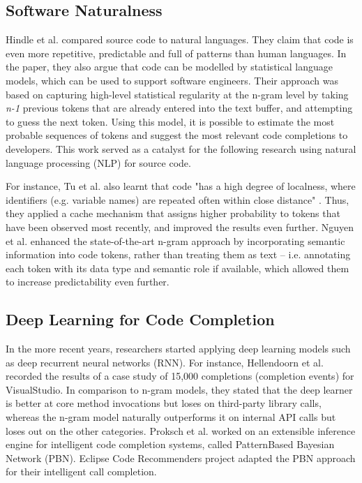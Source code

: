 \documentclass[sigplan,screen]{acmart}
\begin{document}
\subsection{Software Naturalness}
Hindle et al. \cite{Hind12a} compared source code to natural languages. They claim that code is even more repetitive, predictable and full of patterns than human languages. In the paper, they also argue that code can be modelled by statistical language models, which can be used to support software engineers. Their approach was based on capturing high-level statistical regularity at the n-gram level by taking \textit{n-1} previous tokens that are already entered into the text buffer, and attempting to guess the next token. Using this model, it is possible to estimate the most probable sequences of tokens and suggest the most relevant code completions to developers. This work served as a catalyst for the following research using natural language processing (NLP) for source code.

For instance, Tu et al. \cite{Tu14a} also learnt that code "has a high degree of localness, where identifiers (e.g. variable names) are repeated often within close distance" \cite{Alla18a}. Thus, they applied a cache mechanism that assigns higher probability to tokens that have been observed most recently, and improved the results even further. Nguyen et al. \cite{Nguy13a} enhanced the state-of-the-art n-gram approach by incorporating semantic information into code tokens, rather than treating them as text -- i.e. annotating each token with its data type and semantic role if available, which allowed them to increase predictability even further.

\subsection{Deep Learning for Code Completion}
In the more recent years, researchers started applying deep learning models such as deep recurrent neural networks (RNN). For instance, Hellendoorn et al. \cite{Hell19a} recorded the results of a case study of 15,000 completions (completion events) for VisualStudio. In comparison to n-gram models, they stated that the deep learner is better at core method invocations but loses on third-party library calls, whereas the n-gram model naturally outperforms it on internal API calls but loses out on the other categories. Proksch et al. \cite{Prok15a} worked on an extensible inference engine for intelligent code completion systems, called PatternBased Bayesian Network (PBN). Eclipse Code Recommenders project adapted the PBN approach for their intelligent call completion.
\end{document}
